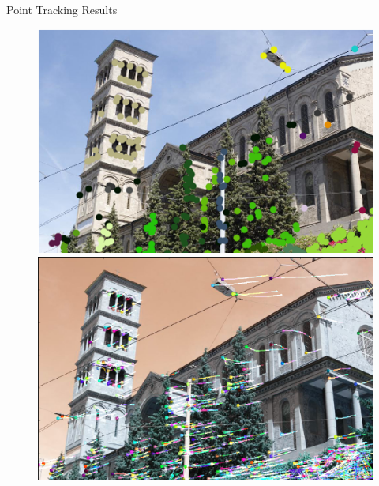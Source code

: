 \begin{frame}{Point Tracking Results}
\begin{figure}[!tbp]
  \centering
  \begin{minipage}[b]{0.49\textwidth}
    \includegraphics[width=\textwidth]{../../Diagrams/first_frame_church_points.png}
  \end{minipage}
	\pause
  \begin{minipage}[b]{0.5\textwidth}
    \includegraphics[width=\textwidth]{../../Diagrams/track_points_church.png}
  \end{minipage}
\end{figure}
\end{frame}

